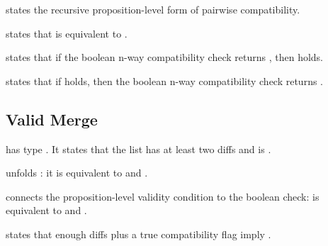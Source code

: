 \begin{theorem}
 states the recursive proposition-level form of
pairwise compatibility.
\end{theorem}

\begin{theorem}
 states that
 is equivalent to .
\end{theorem}

\begin{theorem}
 states that if the boolean n-way compatibility
check returns , then  holds.
\end{theorem}

\begin{theorem}
 states that if 
holds, then the boolean n-way compatibility check returns .
\end{theorem}

\subsection{Valid Merge}

\begin{definition}[ValidMerge]
\code{[ValidMerge]} has type . It states that the list
has at least two diffs and is .
\end{definition}

\begin{theorem}
 unfolds : it is equivalent to
 and .
\end{theorem}

\begin{theorem}
 connects the proposition-level validity condition
to the boolean check:  is equivalent to
 and .
\end{theorem}

\begin{theorem}
 states that enough diffs plus a true compatibility
flag imply .
\end{theorem}


